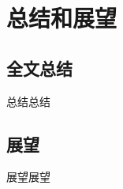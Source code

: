 \chapter{总结和展望}
\label{cha:chap6}
\section{全文总结}
\label{sec:6.1}
总结总结
\section{展望}
\label{sec:6.2}
展望展望